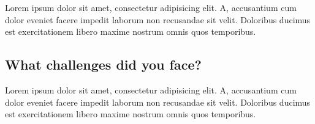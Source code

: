 Lorem ipsum dolor sit amet, consectetur adipisicing elit. A, accusantium cum dolor eveniet facere impedit laborum non recusandae sit velit. Doloribus ducimus est exercitationem libero maxime nostrum omnis quos temporibus.


\subsection{What challenges did you face?}

Lorem ipsum dolor sit amet, consectetur adipisicing elit. A, accusantium cum dolor eveniet facere impedit laborum non recusandae sit velit. Doloribus ducimus est exercitationem libero maxime nostrum omnis quos temporibus.


